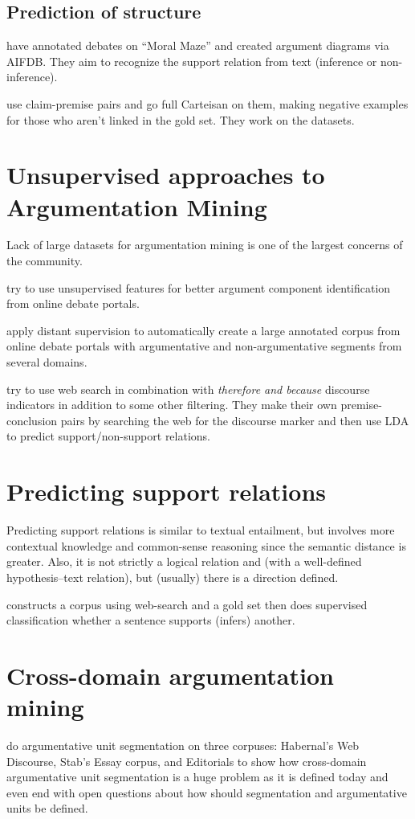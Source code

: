 \documentclass[a4paper,10pt]{article}
\begin{document}
\subsection{Prediction of structure}

\cite{Lawrence2017} have annotated debates on ``Moral Maze'' and created
argument diagrams via AIFDB. They aim to recognize the support relation
from text (inference or non-inference).

\cite{Aker2017} use claim-premise pairs and go full Carteisan on them,
making negative examples for those who aren't linked in the gold set. They
work on the \cite{stab2017parsing, aharoni2014benchmark} datasets.

\section{Unsupervised approaches to Argumentation Mining}

Lack of large datasets for argumentation mining is one of the largest
concerns of the community. 

\cite{habernal2015exploiting} try to use unsupervised features for
better argument component identification from online debate portals. 

\cite{al2016cross} apply distant supervision to automatically create
a large annotated corpus from online debate portals with argumentative and
non-argumentative segments from several domains. 

\cite{Lawrence2017} try to use web search in combination with
\emph{therefore and because} discourse indicators in addition to some
other filtering. They make their own premise-conclusion pairs by searching
the web for the discourse marker and then use LDA to predict
support/non-support relations.

\section{Predicting support relations}

Predicting support relations is similar to textual entailment, but
involves more contextual knowledge and common-sense reasoning since the
semantic distance is greater. Also, it is not strictly a logical relation
and (with a well-defined hypothesis--text relation), but (usually) there
is a direction defined.

\cite{Lawrence2017} constructs a corpus using web-search and a gold set
then does supervised classification whether a sentence supports (infers)
another. 

\section{Cross-domain argumentation mining}

\cite{Ajjour2017} do argumentative unit segmentation on three corpuses:
Habernal's Web Discourse, Stab's Essay corpus, and Editorials to show
how cross-domain argumentative unit segmentation is a huge problem as it
is defined today and even end with open questions about how should
segmentation and argumentative units be defined. 



\end{document}
